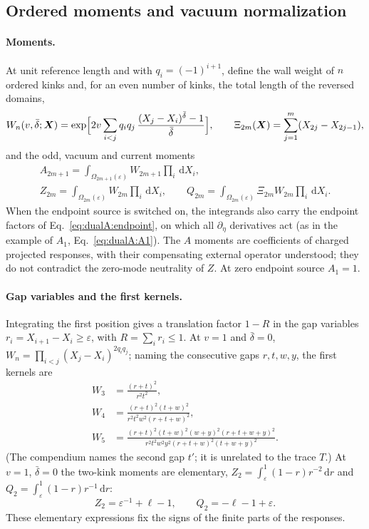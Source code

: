 \documentclass[11pt,a4paper]{article}
\numberwithin{equation}{section}
\newcommand{\dd}{\,\mathrm d}
\newcommand{\db}{\bar\delta}
\begin{document}
\subsection{Ordered moments and vacuum normalization}\label{app:dualA:moments}
\paragraph{Moments.} At unit reference length and with $q_i=(-1)^{i+1}$, define the wall weight of $n$ ordered kinks
and, for an even number of kinks, the total length of the reversed domains,
\begin{equation}
 W_n(v,\db;\boldsymbol X)=\exp\Bigl[2v\sum_{i<j}q_iq_j\,\frac{(X_j-X_i)^{\db}-1}{\db}\Bigr],\qquad
 \Xi_{2m}(\boldsymbol X)=\sum_{j=1}^m(X_{2j}-X_{2j-1}),
\end{equation}
and the odd, vacuum and current moments
\begin{equation}
\begin{gathered}
 A_{2m+1}=\int_{\Omega_{2m+1}(\varepsilon)}W_{2m+1}\prod_i\dd X_i,\\
 Z_{2m}=\int_{\Omega_{2m}(\varepsilon)}W_{2m}\prod_i\dd X_i,\qquad
 Q_{2m}=\int_{\Omega_{2m}(\varepsilon)}\Xi_{2m}W_{2m}\prod_i\dd X_i.
\end{gathered}
 \label{eq:dualA:moments}
\end{equation}
When the endpoint source is switched on, the integrands also carry the endpoint factors of
Eq.~\eqref{eq:dualA:endpoint}, on which all $\partial_\eta$ derivatives act (as in the example of $A_1$,
Eq.~\eqref{eq:dualA:A1}). The $A$ moments are coefficients of charged projected responses, with their compensating
external operator understood; they do not contradict the zero-mode neutrality of $Z$. At zero endpoint source
$A_1=1$.

\paragraph{Gap variables and the first kernels.} Integrating the first position gives a translation factor $1-R$
in the gap variables $r_i=X_{i+1}-X_i\ge\varepsilon$, with $R=\sum_ir_i\le1$. At $v=1$ and $\db=0$,
$W_n=\prod_{i<j}(X_j-X_i)^{2q_iq_j}$; naming the consecutive gaps $r,t,w,y$, the first kernels are
\begin{align}
 W_3&=\frac{(r+t)^2}{r^2t^2},\label{eq:dualA:W3}\\
 W_4&=\frac{(r+t)^2(t+w)^2}{r^2t^2w^2(r+t+w)^2},\label{eq:dualA:W4}\\
 W_5&=\frac{(r+t)^2(t+w)^2(w+y)^2(r+t+w+y)^2}{r^2t^2w^2y^2(r+t+w)^2(t+w+y)^2}.\label{eq:dualA:W5}
\end{align}
(The compendium names the second gap $t'$; it is unrelated to the trace $T$.) At $v=1$, $\db=0$ the two-kink moments
are elementary, $Z_2=\int_\varepsilon^1(1-r)r^{-2}\dd r$ and $Q_2=\int_\varepsilon^1(1-r)r^{-1}\dd r$:
\begin{equation}
 Z_2=\varepsilon^{-1}+\ell-1,\qquad Q_2=-\ell-1+\varepsilon.
 \label{eq:dualA:Z2Q2}
\end{equation}
These elementary expressions fix the signs of the finite parts of the responses.
\end{document}

